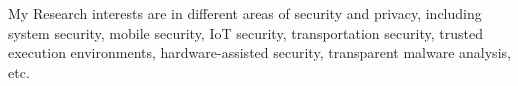 

\begin{cvparagraph}


My Research interests are in different areas of security and privacy,
including system security, mobile security, IoT security, transportation
security, trusted execution environments, hardware-assisted
security, transparent malware analysis, etc.
\end{cvparagraph}
